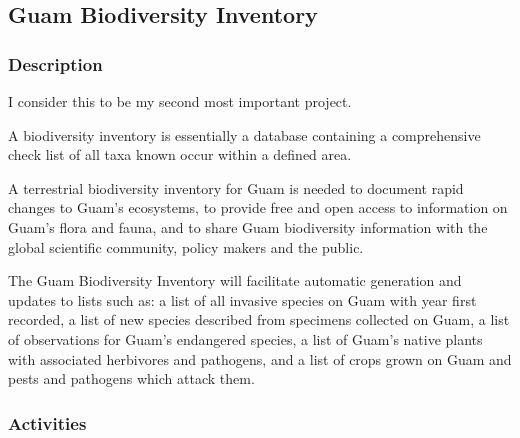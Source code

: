 \subsection{Guam Biodiversity Inventory}
\begin{refsection}
	
	\subsubsection{Description}
	
	I consider this to be my second most important project.
	
	A biodiversity inventory is essentially a database containing a comprehensive
	check list of all taxa known occur within a defined area.
	
	A terrestrial biodiversity inventory for Guam is needed to document
	rapid changes to Guam\textquoteright s ecosystems, to provide free
	and open access to information on Guam\textquoteright s flora and
	fauna, and to share Guam biodiversity information with the global
	scientific community, policy makers and the public.
	
	The Guam Biodiversity Inventory will facilitate automatic generation
	and updates to lists such as: a list of all invasive species on Guam
	with year first recorded, a list of new species described from specimens
	collected on Guam, a list of observations for Guam\textquoteright s
	endangered species, a list of Guam\textquoteright s native plants
	with associated herbivores and pathogens, and a list of crops grown
	on Guam and pests and pathogens which attack them.
	
	\subsubsection{Activities}
	
	\begin{comment}
	\raggedright\vspace{2mm}\textbf{Activity}
	\begin{itemize}
	\item I made a couple of presentations on my plans for the Guam Biodiversity
	Inventory \cite{moore2018building2,moore2018building}.
	\item I designed data model for the Guam Biodiversity Inventory and created
	a prototype web site.
	\end{itemize}
	\raggedright\vspace{2mm}\textbf{Reference(s)}
	

\end{comment}
\end{refsection}
